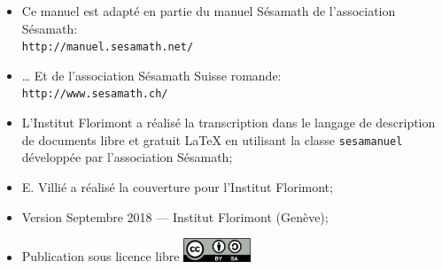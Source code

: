 \documentclass[TS]{sesamanuel}
\begin{document}
\vfill



\newpage

\begin{prerequis}
\begin{itemize}
\item  Ce manuel est adapté en partie du manuel Sésamath de l'association Sésamath:\\
\texttt{http://manuel.sesamath.net/}
\item … Et de l'association Sésamath Suisse romande:\\ \texttt{http://www.sesamath.ch/}
\item L'Institut Florimont a réalisé la transcription dans le langage de description de documents libre et gratuit \LaTeX{} en utilisant la classe \texttt{sesamanuel} développée par l'association Sésamath;
\item E. Villié a réalisé la couverture pour l'Institut Florimont;
\item Version Septembre 2018 --- Institut Florimont (Genève);
\item Publication sous licence libre \includegraphics[width=2cm]{cc-by-sa}
\end{itemize}
 \end{prerequis}

\vspace{1em}

\setcounter{chapter}{0}



\themaC
\themaG


\setcounter{page}{6}
\setcounter{chapter}{8} %

%

\themaC


\themaG

\end{document}
